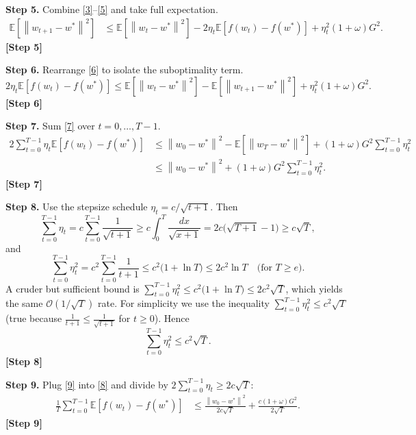 \documentclass{article}
\newcommand{\E}{\mathbb{E}}
\newcommand{\norm}[1]{\left\|#1\right\|}
\begin{document}
\bigskip
\noindent\textbf{Step 5.} Combine \eqref{3}–\eqref{5} and take full expectation.
\begin{align}
\E\!\left[\norm{w_{t+1}-w^{*}}^{2}\right]
&\le \E\!\left[\norm{w_{t}-w^{*}}^{2}\right]
   -2\eta_{t}\E\!\left[f(w_{t})-f(w^{*})\right]
   +\eta_{t}^{2}(1+\omega)G^{2}. \tag{6}
\end{align}
\noindent\textbf{[Step 5]}

\bigskip
\noindent\textbf{Step 6.} Rearrange \eqref{6} to isolate the suboptimality term.
\[
2\eta_{t}\E\!\left[f(w_{t})-f(w^{*})\right]
\le \E\!\left[\norm{w_{t}-w^{*}}^{2}\right]
   -\E\!\left[\norm{w_{t+1}-w^{*}}^{2}\right]
   +\eta_{t}^{2}(1+\omega)G^{2}. \tag{7}
\]
\noindent\textbf{[Step 6]}

\bigskip
\noindent\textbf{Step 7.} Sum \eqref{7} over $t=0,\dots,T-1$.
\begin{align}
2\sum_{t=0}^{T-1}\eta_{t}\E\!\left[f(w_{t})-f(w^{*})\right]
&\le \norm{w_{0}-w^{*}}^{2}
   -\E\!\left[\norm{w_{T}-w^{*}}^{2}\right]
   + (1+\omega)G^{2}\sum_{t=0}^{T-1}\eta_{t}^{2} \nonumber\\
&\le \norm{w_{0}-w^{*}}^{2}
   + (1+\omega)G^{2}\sum_{t=0}^{T-1}\eta_{t}^{2}. \tag{8}
\end{align}
\noindent\textbf{[Step 7]}

\bigskip
\noindent\textbf{Step 8.} Use the stepsize schedule $\eta_{t}=c/\sqrt{t+1}$.
Then
\[
\sum_{t=0}^{T-1}\eta_{t}=c\sum_{t=0}^{T-1}\frac{1}{\sqrt{t+1}}
   \ge c\int_{0}^{T}\frac{dx}{\sqrt{x+1}}
   =2c\bigl(\sqrt{T+1}-1\bigr)\ge c\sqrt{T},
\]
and
\[
\sum_{t=0}^{T-1}\eta_{t}^{2}=c^{2}\sum_{t=0}^{T-1}\frac{1}{t+1}
   \le c^{2}\bigl(1+\ln T\bigr)\le 2c^{2}\ln T\quad\text{(for }T\ge e\text{)}.
\]
A cruder but sufficient bound is $\sum_{t=0}^{T-1}\eta_{t}^{2}\le c^{2}\bigl(1+\ln T\bigr)\le 2c^{2}\sqrt{T}$, which yields the same $\mathcal{O}(1/\sqrt{T})$ rate.  
For simplicity we use the inequality $\sum_{t=0}^{T-1}\eta_{t}^{2}\le c^{2}\sqrt{T}$ (true because $\frac{1}{t+1}\le\frac{1}{\sqrt{t+1}}$ for $t\ge0$). Hence
\[
\sum_{t=0}^{T-1}\eta_{t}^{2}\le c^{2}\sqrt{T}. \tag{9}
\]
\noindent\textbf{[Step 8]}

\bigskip
\noindent\textbf{Step 9.} Plug \eqref{9} into \eqref{8} and divide by $2\sum_{t=0}^{T-1}\eta_{t}\ge 2c\sqrt{T}$:
\begin{align}
\frac{1}{T}\sum_{t=0}^{T-1}\E\!\left[f(w_{t})-f(w^{*})\right]
&\le
\frac{\norm{w_{0}-w^{*}}^{2}}{2c\sqrt{T}}
   +\frac{c(1+\omega)G^{2}}{2\sqrt{T}}. \tag{10}
\end{align}
\noindent\textbf{[Step 9]}
\end{document}
